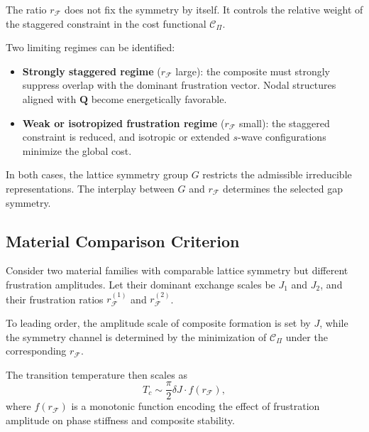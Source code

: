     The ratio $r_{\mathcal F}$ does not fix the symmetry by itself.
    It controls the relative weight of the staggered constraint
    in the cost functional $\mathcal{C}_{\Pi}$.

    Two limiting regimes can be identified:

    \begin{itemize}
      \item
      \textbf{Strongly staggered regime}
      ($r_{\mathcal F}$ large):
      the composite must strongly suppress overlap
      with the dominant frustration vector.
      Nodal structures aligned with $\mathbf{Q}$
      become energetically favorable.

      \item
      \textbf{Weak or isotropized frustration regime}
      ($r_{\mathcal F}$ small):
      the staggered constraint is reduced,
      and isotropic or extended $s$-wave
      configurations minimize the global cost.
    \end{itemize}

    In both cases,
    the lattice symmetry group $G$
    restricts the admissible irreducible representations.
    The interplay between $G$ and $r_{\mathcal F}$
    determines the selected gap symmetry.

  \subsection{Material Comparison Criterion}
    \label{subsec:material-comparison}

    Consider two material families
    with comparable lattice symmetry
    but different frustration amplitudes.
    Let their dominant exchange scales be
    $J_1$ and $J_2$,
    and their frustration ratios
    $r_{\mathcal F}^{(1)}$ and $r_{\mathcal F}^{(2)}$.

    To leading order,
    the amplitude scale of composite formation
    is set by $J$,
    while the symmetry channel
    is determined by the minimization of
    $\mathcal{C}_{\Pi}$
    under the corresponding $r_{\mathcal F}$.

    The transition temperature then scales as
    \begin{equation}
      T_c
      \sim
      \frac{\pi}{2}
      \delta J
      \cdot
      f(r_{\mathcal F}),
      \label{eq:Tc-general}
    \end{equation}
    where $f(r_{\mathcal F})$
    is a monotonic function encoding
    the effect of frustration amplitude
    on phase stiffness and composite stability.

